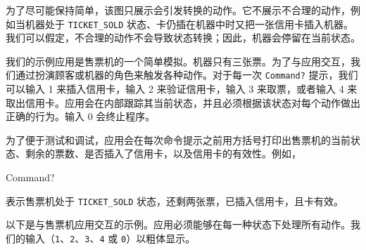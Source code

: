 
为了尽可能保持简单，该图只展示会引发转换的动作。它不展示不合理的动作，例如当机器处于 \texttt{TICKET\_\allowbreak{}SOLD} 状态、卡仍插在机器中时又把一张信用卡插入机器。我们可以假定，不合理的动作不会导致状态转换；因此，机器会停留在当前状态。

我们的示例应用是售票机的一个简单模拟。机器只有三张票。为了与应用交互，我们通过扮演顾客或机器的角色来触发各种动作。对于每一次 \texttt{Command?} 提示，我们可以输入 1 来插入信用卡，输入 2 来验证信用卡，输入 3 来取票，或者输入 4 来取出信用卡。应用会在内部跟踪其当前状态，并且必须根据该状态对每个动作做出正确的行为。输入 0 会终止程序。

为了便于测试和调试，应用会在每次命令提示之前用方括号打印出售票机的当前状态、剩余的票数、是否插入了信用卡，以及信用卡的有效性。例如，

\begin{codebox}
 Command?
\end{codebox}

表示售票机处于 \texttt{TICKET\_\allowbreak{}SOLD} 状态，还剩两张票，已插入信用卡，且卡有效。

以下是与售票机应用交互的示例。应用必须能够在每一种状态下处理所有动作。我们的输入（\texttt{1}、\texttt{2}、\texttt{3}、\texttt{4} 或 \texttt{0}）以粗体显示。

